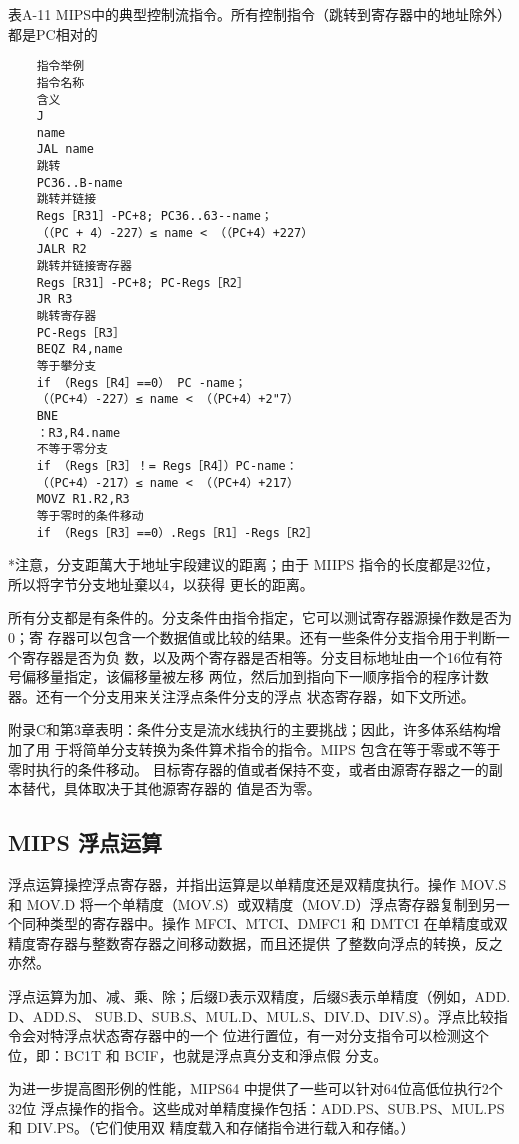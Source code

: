 表A-11 MIPS中的典型控制流指令。所有控制指令（跳转到寄存器中的地址除外）都是PC相对的
\begin{verbatim}
    指令举例
    指令名称
    含义
    J
    name
    JAL name
    跳转
    PC36..B-name
    跳转并链接
    Regs［R31］-PC+8; PC36..63--name；
    （（PC + 4）-227）≤ name < （（PC+4）+227）
    JALR R2
    跳转并链接寄存器
    Regs［R31］-PC+8; PC-Regs［R2］
    JR R3
    眺转寄存器
    PC-Regs［R3］
    BEQZ R4,name
    等于攀分支
    if （Regs［R4］==0） PC -name；
    （（PC+4）-227）≤ name < （（PC+4）+2"7）
    BNE
    ：R3,R4.name
    不等于零分支
    if （Regs［R3］！= Regs［R4］）PC-name：
    （（PC+4）-217）≤ name < （（PC+4）+217）
    MOVZ R1.R2,R3
    等于零时的条件移动
    if （Regs［R3］==0）.Regs［R1］-Regs［R2］
\end{verbatim}
*注意，分支距萬大于地址宇段建议的距离；由于 MIIPS 指令的长度都是32位，所以将字节分支地址棄以4，以获得
更长的距离。

所有分支都是有条件的。分支条件由指令指定，它可以测试寄存器源操作数是否为 0；寄
存器可以包含一个数据值或比较的结果。还有一些条件分支指令用于判断一个寄存器是否为负
数，以及两个寄存器是否相等。分支目标地址由一个16位有符号偏移量指定，该偏移量被左移
两位，然后加到指向下一顺序指令的程序计数器。还有一个分支用来关注浮点条件分支的浮点
状态寄存器，如下文所述。

附录C和第3章表明：条件分支是流水线执行的主要挑战；因此，许多体系结构增加了用
于将简单分支转换为条件算术指令的指令。MIPS 包含在等于零或不等于零时执行的条件移动。
目标寄存器的值或者保持不变，或者由源寄存器之一的副本替代，具体取决于其他源寄存器的
值是否为零。

\subsection{MIPS 浮点运算}

浮点运算操控浮点寄存器，并指出运算是以单精度还是双精度执行。操作 MOV.S 和 MOV.D
将一个单精度（MOV.S）或双精度（MOV.D）浮点寄存器复制到另一个同种类型的寄存器中。操作
MFCI、MTCI、DMFC1 和 DMTCI 在单精度或双精度寄存器与整数寄存器之间移动数据，而且还提供
了整数向浮点的转换，反之亦然。

浮点运算为加、减、乘、除；后缀D表示双精度，后缀S表示单精度（例如，ADD. D、ADD.S、
SUB.D、SUB.S、MUL.D、MUL.S、DIV.D、DIV.S）。浮点比较指令会对特浮点状态寄存器中的一个
位进行置位，有一对分支指令可以检测这个位，即：BC1T 和 BCIF，也就是浮点真分支和淨点假
分支。

为进一步提高图形例的性能，MIPS64 中提供了一些可以针对64位高低位执行2个32位
浮点操作的指令。这些成对单精度操作包括：ADD.PS、SUB.PS、MUL.PS 和 DIV.PS。（它们使用双
精度载入和存储指令进行载入和存储。）

